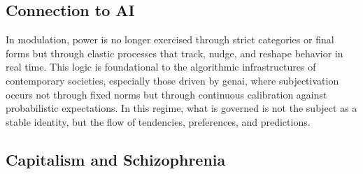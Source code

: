 \subsection{Connection to AI}



In modulation, power is no longer exercised through strict categories or final forms but through elastic processes that track, nudge, and reshape behavior in real time. This logic is foundational to the algorithmic infrastructures of contemporary societies, especially those driven by \gls{genai}, where subjectivation occurs not through fixed norms but through continuous calibration against probabilistic expectations. In this regime, what is governed is not the subject as a stable identity, but the flow of tendencies, preferences, and predictions.




\subsection{Capitalism and Schizophrenia}



